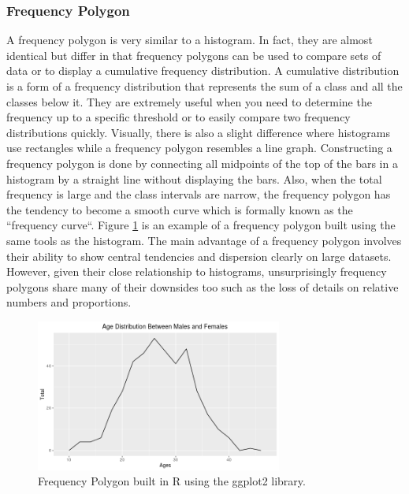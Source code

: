 \subsubsection{Frequency Polygon}
A frequency polygon is very similar to a histogram. In fact, they are almost 
identical but differ in that frequency polygons can be used to compare sets of data or 
to display a cumulative frequency distribution. A cumulative distribution is a 
form of a frequency distribution that represents the sum of a class and all the
classes below it. They are extremely useful when you need to determine the frequency 
up to a specific threshold or to easily compare two frequency distributions quickly.
Visually, there is also a slight difference where histograms use rectangles 
while a frequency polygon resembles a line graph. Constructing a frequency polygon 
is done by connecting all midpoints of the top of the bars in a histogram by a 
straight line without displaying the bars. Also, when the total frequency is large 
and the class intervals are narrow, the frequency polygon has the tendency to become 
a smooth curve which is formally known as the ``frequency curve``. Figure \ref{figure:freq_polygon}
is an example of a frequency polygon built using the same tools as the histogram. The 
main advantage of a frequency polygon involves their ability to show central 
tendencies and dispersion clearly on large datasets. However, given their close 
relationship to histograms, unsurprisingly frequency polygons share many of their 
downsides too such as the loss of details on relative numbers and proportions. 

\begin{figure}[!ht]
    \centering
        \includegraphics[height=5cm]{figures/freq_polygon.png}
    \caption{Frequency Polygon built in R using the ggplot2 library.}
    \label{figure:freq_polygon}
\end{figure}  

